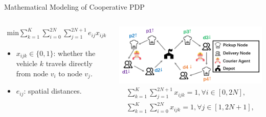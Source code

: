 \documentclass{beamer}
\begin{document}
\begin{frame}{Mathematical Modeling of Cooperative PDP}
	\centering
	\small
	\begin{columns}
		\begin{column}{0.4\textwidth}
			\begin{align}
				\mathrm{min} \sum_{k=1}^{K}\sum_{i=0}^{2N}\sum_{j=1}^{2N+1}e_{ij}x_{ijk}
			\end{align}
			\begin{itemize}
				\small
				\item $x_{ijk}\in\{0,1\}$: whether the vehicle $k$ travels directly from node $v_i$ to node $v_j$.
				\item $e_{ij}$: spatial distances.
			\end{itemize}

		\end{column}
		\begin{column}{0.6\textwidth}
			\centering
			\includegraphics[width=\textwidth]{show.png}
			\begin{align}
				\sum_{k=1}^{K}\sum_{j=1}^{2N+1}x_{ijk}=1,\forall i\in[0,2N], \\
				\sum_{k=1}^{K}\sum_{i=0}^{2N}x_{ijk}=1,\forall j\in[1,2N+1],
			\end{align}
		\end{column}
	\end{columns}
\end{frame}
\end{document}
